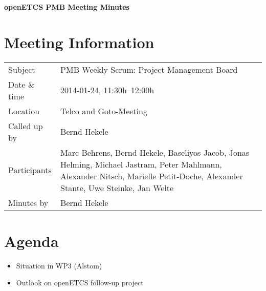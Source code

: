 \documentclass[a4paper, 11pt]{article}
\begin{document}
{\begin{center}\huge\bf openETCS PMB Meeting Minutes\end{center}}
\section{Meeting Information}

\renewcommand{\arraystretch}{1.5}
\begin{supertabular}{m{.2\textwidth}m{.8\textwidth}}
Subject & PMB Weekly Scrum: Project Management Board\\
Date \& time & 2014-01-24, 11:30h--12:00h\\
Location & Telco and Goto-Meeting\\
Called up by & Bernd Hekele\\
Participants &
Marc Behrens,
Bernd Hekele,
Baseliyos Jacob,
Jonas Helming,
Michael Jastram,
Peter Mahlmann,
Alexander Nitsch,
Marielle Petit-Doche,
Alexander Stante,
Uwe Steinke,
Jan Welte
\\

Minutes by & Bernd Hekele\\

\end{supertabular}
\renewcommand{\arraystretch}{1.0}


\section{{Agenda}}

\begin{itemize}
\item Situation in WP3 (Alstom)
\item Outlook on openETCS follow-up project
\end{itemize}
\end{document}
